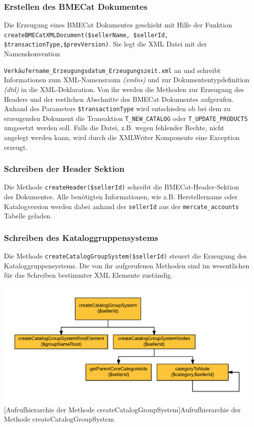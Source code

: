 	
	
	
	
	\subsubsection{Erstellen des BMECat Dokumentes}
	
	Die Erzeugung eines BMECat Dokumentes geschieht mit Hilfe der Funktion \texttt{createBMECatXMLDocument\-(\$sellerName, \$sellerId, \$transactionType,\$prevVersion)}. Sie legt die XML Datei mit der Namenskonvention {\texttt{Verkäufername\_Erzeugungsdatum\_Erzeugungszeit.xml} an und  schreibt Informationen zum XML-Namensraum \textit{(xmlns)} und zur Dokumententypdefinition \textit{(dtd)} in die XML-Deklaration. Von ihr werden die Methoden zur Erzeugung des Headers und der restlichen Abschnitte des BMECat Dokumentes aufgerufen.
	Anhand des Parameters \texttt{\$transactionType} wird entschieden ob bei dem zu erzeugenden Dokument die Transaktion \texttt{T\_NEW\_CATALOG} oder \texttt{T\_UPDATE\_PRODUCTS} umgesetzt werden soll. Falls die Datei, z.B. wegen fehlender Rechte, nicht angelegt werden kann, wird durch die XMLWriter Komponente eine Exception erzeugt.
	
	\subsubsection{Schreiben der Header Sektion}

	Die Methode \texttt{createHeader(\$sellerId)} schreibt die BMECat-Header-Sektion des Dokumentes. Alle benö\-tigten Informationen, wie z.B. Herstellername oder Katalogversion werden dabei anhand der \texttt{sellerId} aus der \texttt{mercate\_accounts} Tabelle geladen.
	
	\subsubsection{Schreiben des Kataloggruppensystems}
	
	Die Methode \texttt{createCatalogGroupSystem(\$sellerId)} steuert die Erzeugung des Kataloggruppensystems. Die von ihr aufgerufenen Methoden sind im wesentlichen für das Schreiben bestimmter XML Elemente zuständig.\\
	\begin{minipage}{\linewidth}
		\vspace{1em}
		\centering
		\includegraphics[width=0.7 \linewidth]{img/CreateCatalogGroupSystemHierarchie}
		[Aufrufhierarchie der Methode createCatalogGroupSystem]{Aufrufhierarchie der Methode createCatalogGroupSystem}
		\vspace{1em}
	\end{minipage}
	
}
